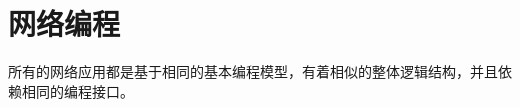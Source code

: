 
\chapter{网络编程}
{
    所有的网络应用都是基于相同的基本编程模型，有着相似的整体逻辑结构，并且依赖相同的编程接口。

    
}

\cleardoublepage

\endinput
